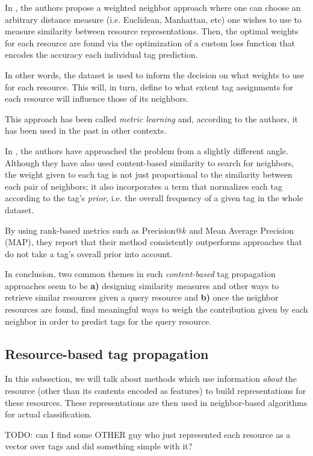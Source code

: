 In \cite{guillaumin_etal_2009}, the authors propose a weighted neighbor approach where one can choose an arbitrary distance measure (i.e. Euclidean, Manhattan, etc) one wishes to use to measure similarity between resource representations. Then, the optimal weights for each resource are found via the optimization of a custom loss function that encodes the accuracy each individual tag prediction. 

In other words, the dataset is used to inform the decision on what weights to use for each resource. This will, in turn, define to what extent tag assignments for each resource will influence those of its neighbors.

This approach has been called \textit{metric learning} and, according to the authors, it has been used in the past in other contexts.

In \cite{li_etal_2009}, the authors have approached the problem from a slightly different angle. Although they have also used content-based similarity to search for neighbors, the weight given to each tag is not just proportional to the similarity between each pair of neighbors; it also incorporates a term that normalizes each tag according to the tag's \textit{prior}, i.e. the overall frequency of a given tag in the whole dataset.

By using rank-based metrics such as Precision@$k$ and Mean Average Precision (MAP), they report that their method consistently outperforms approaches that do not take a tag's overall prior into account.

In conclusion, two common themes in such \textit{content-based} tag propagation approaches seem to be \textbf{a)} designing similarity measures and other ways to retrieve similar resources given a query resource and \textbf{b)} once the neighbor resources are found, find meaningful ways to weigh the contribution given by each neighbor in order to predict tags for the query resource. 

\subsection{Resource-based tag propagation}

In this subsection, we will talk about methods which use information \textit{about} the resource (other than its contents encoded as features) to build representations for these resources. These representations are then used in neighbor-based algorithms for actual classification.

{\color{red} TODO: can I find some OTHER guy who just represented each resource as a vector over tags and did something simple with it?}

